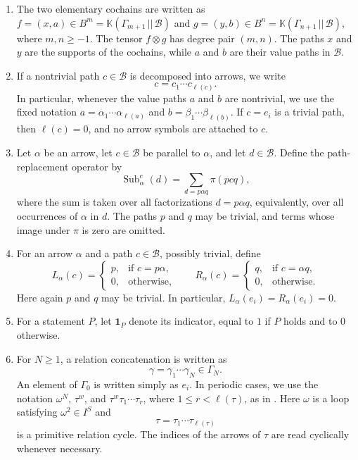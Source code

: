 \documentclass[11pt,a4paper,reqno]{amsart}
\newcommand{\mK}{\mathbb K}
\newcommand{\mB}{\mathcal B}
\newcommand{\Sub}{\operatorname{Sub}}
\newcommand{\para}[2]{(#1,#2)}
\newcommand{\Para}[2]{(#1\,||\,#2)}
\newcommand{\one}{\mathbf 1}
\theoremstyle{plain}
\theoremstyle{definition}
\numberwithin{equation}{section}
\begin{document}
	\begin{enumerate}[label=\textup{(N\arabic*)}]
		\item The two elementary cochains are written as
		$f=\para{x}{a}\in B^m=\mK\Para{\Gamma_{m+1}}{\mB}$ and
		$g=\para{y}{b}\in B^n=\mK\Para{\Gamma_{n+1}}{\mB}$, where
		$m,n\geq-1$. The tensor $f\otimes g$ has degree pair $(m,n)$.
		The paths $x$ and $y$ are the supports of the cochains, while $a$ and $b$
		are their value paths in $\mB$.
		
		\item If a nontrivial path $c\in\mB$ is decomposed into arrows, we write
		\[
		c=c_1\cdots c_{\ell(c)}.
		\]
		In particular, whenever the value paths $a$ and $b$ are nontrivial, we use
		the fixed notation
		$a=\alpha_1\cdots\alpha_{\ell(a)}$ and $b=\beta_1\cdots\beta_{\ell(b)}$.
		If $c=e_i$ is a trivial path, then $\ell(c)=0$, and no arrow symbols are
		attached to $c$.
		
		\item Let $\alpha$ be an arrow, let $c\in\mB$ be parallel to $\alpha$, and let
		$d\in\mB$. Define the path-replacement operator by
		\[
		\Sub_\alpha^c(d)
		=
		\sum_{d=p\alpha q}\pi(pcq),
		\]
		where the sum is taken over all factorizations $d=p\alpha q$, equivalently,
		over all occurrences of $\alpha$ in $d$. The paths $p$ and $q$ may be
		trivial, and terms whose image under $\pi$ is zero are omitted.
		
		\item For an arrow $\alpha$ and a path $c\in\mB$, possibly trivial, define
		\[
		L_\alpha(c)=
		\begin{cases}
			p, & \text{if } c=p\alpha,\\
			0, & \text{otherwise},
		\end{cases}
		\qquad
		R_\alpha(c)=
		\begin{cases}
			q, & \text{if } c=\alpha q,\\
			0, & \text{otherwise.}
		\end{cases}
		\]
		Here again $p$ and $q$ may be trivial. In particular,
		$L_\alpha(e_i)=R_\alpha(e_i)=0$.
		
		\item For a statement $P$, let $\one_P$ denote its indicator, equal to $1$ if
		$P$ holds and to $0$ otherwise.
		
		\item For $N\geq1$, a relation concatenation is written as
		\[
		\gamma=\gamma_1\cdots\gamma_N\in\Gamma_N.
		\]
		An element of $\Gamma_0$ is written simply as $e_i$. In periodic cases,
		we use the notation $\omega^N$, $\tau^w$, and
		$\tau^w\tau_1\cdots\tau_r$, where $1\leq r<\ell(\tau)$, as in
		. Here $\omega$ is a loop satisfying $\omega^2\in I^S$ and
		\[
		\tau=\tau_1\cdots\tau_{\ell(\tau)}
		\]
		is a primitive relation cycle. The indices of the arrows of $\tau$ are read
		cyclically whenever necessary.
		

\end{enumerate}
\end{document}
